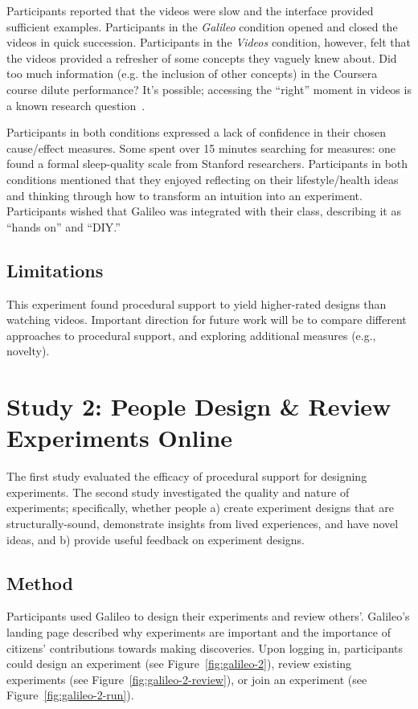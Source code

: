 Participants reported that the videos were slow and the interface provided sufficient examples. Participants in the \textit{Galileo} condition opened and closed the videos in quick succession. Participants in the \textit{Videos} condition, however, felt that the videos provided a refresher of some concepts they vaguely knew about. Did too much information (e.g. the inclusion of other concepts) in the Coursera course dilute performance? It's possible; accessing the “right” moment in videos is a known research question~\cite{kim2014crowdsourcing}. 

Participants in both conditions expressed a lack of confidence in their chosen cause/effect measures. Some spent over 15 minutes searching for measures: one found a formal sleep-quality scale from Stanford researchers. Participants in both conditions mentioned that they enjoyed reflecting on their lifestyle/health ideas and thinking through how to transform an intuition into an experiment. Participants wished that Galileo was integrated with their class, describing it as “hands on” and “DIY.” 

\subsection*{Limitations}
This experiment found procedural support to yield higher-rated designs than watching videos. Important direction for future work will be to compare different approaches to procedural support, and exploring additional measures (e.g., novelty). 

\section{Study 2: People Design \& Review Experiments Online}
The first study evaluated the efficacy of procedural support for designing experiments. The second study investigated the quality and nature of experiments; specifically, whether people a) create experiment designs that are structurally-sound, demonstrate insights from lived experiences, and have novel ideas, and b) provide useful feedback on experiment designs. 

\subsection*{Method}
Participants used Galileo to design their experiments and review others'. Galileo's landing page described why experiments are important and the importance of citizens' contributions towards making discoveries. Upon logging in, participants could design an experiment (see Figure~\ref{fig:galileo-2}), review existing experiments (see Figure~\ref{fig:galileo-2-review}), or join an experiment (see Figure~\ref{fig:galileo-2-run}). 

